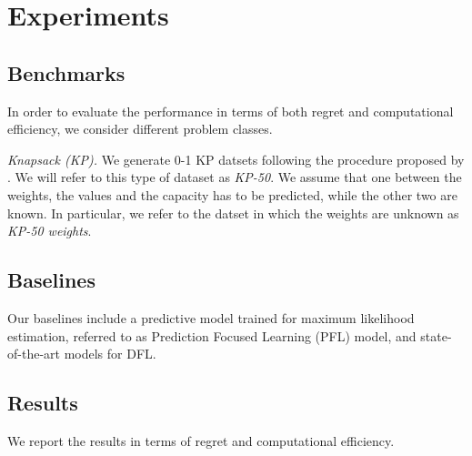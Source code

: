 \section{Experiments}

\subsection{Benchmarks}

In order to evaluate the performance in terms of both regret and computational efficiency, we consider different problem classes.

\textit{Knapsack (KP).} We generate 0-1 KP datsets following the procedure proposed 
by \cite{elmachtoub2022smart}. We will refer to this type of dataset as \textit{KP-50}. 
We assume that one between the weights, the values and the capacity has to be predicted, 
while the other two are known. In particular, we refer to the datset in which the weights are unknown as \textit{KP-50 weights}.

\subsection{Baselines}

Our baselines include a predictive model trained for maximum likelihood estimation, 
referred to as Prediction Focused Learning (PFL) model, 
and state-of-the-art models for DFL.

\subsection{Results}

We report the results in terms of regret and computational efficiency.

